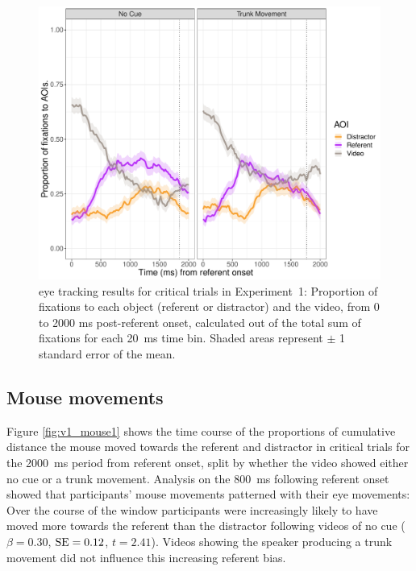 \documentclass[a4paper,man,natbib]{apa6}
\newcommand{\resultsLM}[3]{$\beta = #1$, $\textnormal{SE} = #2$, $t #3$}
\begin{document}
\begin{figure}[Ht]
  \centering
	\includegraphics[width=\linewidth]{./img/e7_fixations_crit.pdf}
  \caption{eye tracking results for critical trials in Experiment~1: Proportion of fixations to each object (referent or distractor) and the video, from 0 to 2000 ms post-referent onset, calculated out of the total sum of fixations for each 20~ms time bin. Shaded areas represent $\pm$ 1 standard error of the mean.}
  \label{fig:v1_eye1}
\end{figure}

\subsection{Mouse movements}
Figure \ref{fig:v1_mouse1} shows the time course of the proportions of cumulative distance the mouse moved towards the referent and distractor in critical trials for the 2000~ms period from referent onset, split by whether the video showed either no cue or a trunk movement.
Analysis on the 800~ms following referent onset showed that participants' mouse movements patterned with their eye movements:
Over the course of the window participants were increasingly likely to have moved more towards the referent than the distractor following videos of no cue (\resultsLM{0.30}{0.12}{=2.41}). 
Videos showing the speaker producing a trunk movement did not influence this increasing referent bias.
\end{document}
